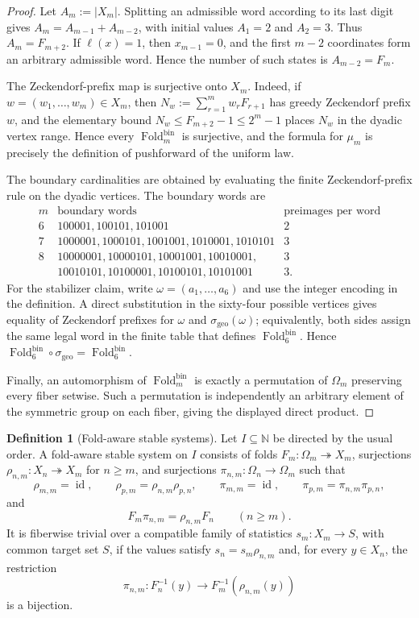 \documentclass[12pt,a4paper]{article}
\theoremstyle{plain}
\theoremstyle{definition}
\newtheorem{definition}[theorem]{Definition}
\numberwithin{equation}{section}
\newcommand{\NN}{\mathbb{N}}
\newcommand{\Fold}{\operatorname{Fold}}
\begin{document}
\begin{proof}
Let \(A_m:=|X_m|\).  Splitting an admissible word according to its last digit gives \(A_m=A_{m-1}+A_{m-2}\), with initial values \(A_1=2\) and \(A_2=3\).  Thus \(A_m=F_{m+2}\).  If \(\ell(x)=1\), then \(x_{m-1}=0\), and the first \(m-2\) coordinates form an arbitrary admissible word.  Hence the number of such states is \(A_{m-2}=F_m\).

The Zeckendorf-prefix map is surjective onto \(X_m\).  Indeed, if \(w=(w_1,\ldots,w_m)\in X_m\), then \(N_w:=\sum_{r=1}^m w_rF_{r+1}\) has greedy Zeckendorf prefix \(w\), and the elementary bound \(N_w\le F_{m+2}-1\le 2^m-1\) places \(N_w\) in the dyadic vertex range.  Hence every \(\Fold_m^{\mathrm{bin}}\) is surjective, and the formula for \(\mu_m\) is precisely the definition of pushforward of the uniform law.

The boundary cardinalities are obtained by evaluating the finite Zeckendorf-prefix rule on the dyadic vertices.  The boundary words are
\[
\begin{array}{c|l|c}
m&\text{boundary words}&\text{preimages per word}\\ \hline
6&100001,100101,101001&2\\
7&1000001,1000101,1001001,1010001,1010101&3\\
8&10000001,10000101,10001001,10010001,&3\\
 &10010101,10100001,10100101,10101001&3.
\end{array}
\]
For the stabilizer claim, write \(\omega=(a_1,\ldots,a_6)\) and use the integer encoding in the definition.  A direct substitution in the sixty-four possible vertices gives equality of Zeckendorf prefixes for \(\omega\) and \(\sigma_{\mathrm{geo}}(\omega)\); equivalently, both sides assign the same legal word in the finite table that defines \(\Fold_6^{\mathrm{bin}}\).  Hence \(\Fold_6^{\mathrm{bin}}\circ\sigma_{\mathrm{geo}}=\Fold_6^{\mathrm{bin}}\).

Finally, an automorphism of \(\Fold_m^{\mathrm{bin}}\) is exactly a permutation of \(\Omega_m\) preserving every fiber setwise.  Such a permutation is independently an arbitrary element of the symmetric group on each fiber, giving the displayed direct product. \qedhere
\end{proof}

\begin{definition}[Fold-aware stable systems]\label{def:fold-aware-stable-system}
Let \(I\subseteq\NN\) be directed by the usual order.  A fold-aware stable system on \(I\) consists of folds \(F_m:\Omega_m\twoheadrightarrow X_m\), surjections \(\rho_{n,m}:X_n\twoheadrightarrow X_m\) for \(n\ge m\), and surjections \(\pi_{n,m}:\Omega_n\to\Omega_m\) such that
\[
\rho_{m,m}=\operatorname{id},\qquad
\rho_{p,m}=\rho_{n,m}\rho_{p,n},
\qquad
\pi_{m,m}=\operatorname{id},
\qquad
\pi_{p,m}=\pi_{n,m}\pi_{p,n},
\]
and
\[
F_m\pi_{n,m}=\rho_{n,m}F_n
\qquad(n\ge m).
\]
It is fiberwise trivial over a compatible family of statistics \(s_m:X_m\to S\), with common target set \(S\), if the values satisfy \(s_n=s_m\rho_{n,m}\) and, for every \(y\in X_n\), the restriction
\[
\pi_{n,m}:F_n^{-1}(y)\longrightarrow F_m^{-1}(\rho_{n,m}(y))
\]
is a bijection.
\end{definition}
\end{document}
